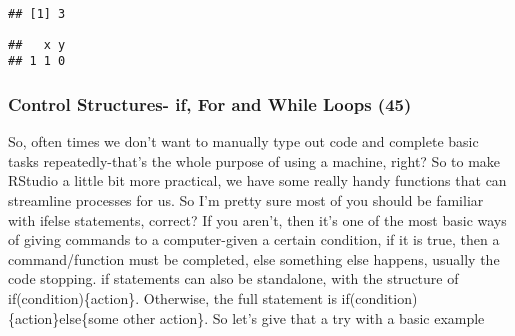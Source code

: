 \documentclass[
]{article}
\newenvironment{Shaded}{\begin{snugshade}}{\end{snugshade}}
\newcommand{\AttributeTok}[1]{\textcolor[rgb]{0.77,0.63,0.00}{#1}}
\newcommand{\CommentTok}[1]{\textcolor[rgb]{0.56,0.35,0.01}{\textit{#1}}}
\newcommand{\ConstantTok}[1]{\textcolor[rgb]{0.00,0.00,0.00}{#1}}
\newcommand{\DecValTok}[1]{\textcolor[rgb]{0.00,0.00,0.81}{#1}}
\newcommand{\FunctionTok}[1]{\textcolor[rgb]{0.00,0.00,0.00}{#1}}
\newcommand{\NormalTok}[1]{#1}
\newcommand{\OtherTok}[1]{\textcolor[rgb]{0.56,0.35,0.01}{#1}}
\newcommand{\SpecialCharTok}[1]{\textcolor[rgb]{0.00,0.00,0.00}{#1}}
\begin{document}
\begin{Shaded}
\end{Shaded}

\begin{verbatim}
## [1] 3
\end{verbatim}

\begin{Shaded}
\end{Shaded}

\begin{verbatim}
##   x y
## 1 1 0
\end{verbatim}

\hypertarget{control-structures--if-for-and-while-loops-45}{%
\subsubsection{Control Structures- if, For and While Loops
(45)}\label{control-structures--if-for-and-while-loops-45}}

So, often times we don't want to manually type out code and complete
basic tasks repeatedly-that's the whole purpose of using a machine,
right? So to make RStudio a little bit more practical, we have some
really handy functions that can streamline processes for us. So I'm
pretty sure most of you should be familiar with ifelse statements,
correct? If you aren't, then it's one of the most basic ways of giving
commands to a computer-given a certain condition, if it is true, then a
command/function must be completed, else something else happens, usually
the code stopping. if statements can also be standalone, with the
structure of if(condition)\{action\}. Otherwise, the full statement is
if(condition)\{action\}else\{some other action\}. So let's give that a
try with a basic example
\end{document}
